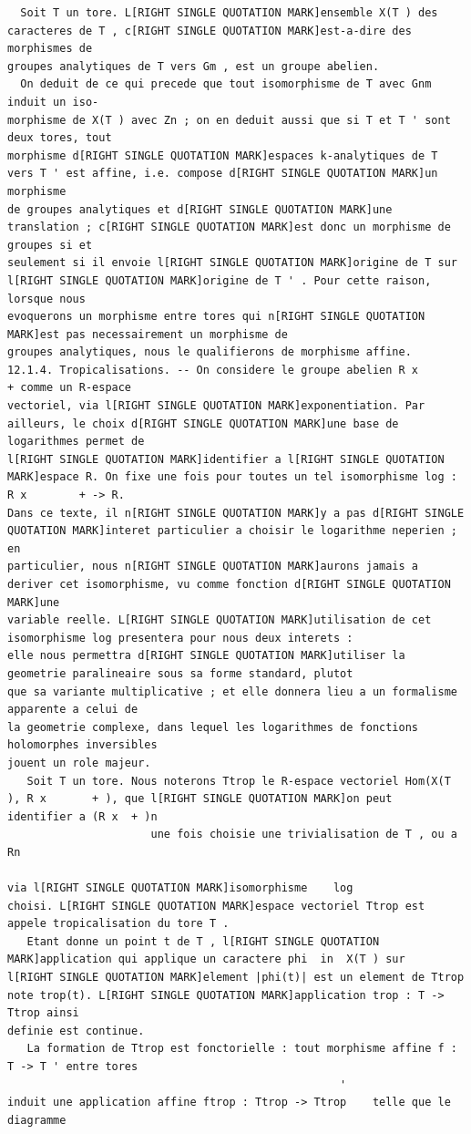 \documentclass[
  11pt,
]{article}
\begin{document}
\begin{lstlisting}
  Soit T un tore. L[RIGHT SINGLE QUOTATION MARK]ensemble X(T ) des caracteres de T , c[RIGHT SINGLE QUOTATION MARK]est-a-dire des morphismes de
groupes analytiques de T vers Gm , est un groupe abelien.
  On deduit de ce qui precede que tout isomorphisme de T avec Gnm induit un iso-
morphisme de X(T ) avec Zn ; on en deduit aussi que si T et T ' sont deux tores, tout
morphisme d[RIGHT SINGLE QUOTATION MARK]espaces k-analytiques de T vers T ' est affine, i.e. compose d[RIGHT SINGLE QUOTATION MARK]un morphisme
de groupes analytiques et d[RIGHT SINGLE QUOTATION MARK]une translation ; c[RIGHT SINGLE QUOTATION MARK]est donc un morphisme de groupes si et
seulement si il envoie l[RIGHT SINGLE QUOTATION MARK]origine de T sur l[RIGHT SINGLE QUOTATION MARK]origine de T ' . Pour cette raison, lorsque nous
evoquerons un morphisme entre tores qui n[RIGHT SINGLE QUOTATION MARK]est pas necessairement un morphisme de
groupes analytiques, nous le qualifierons de morphisme affine.
12.1.4. Tropicalisations. -- On considere le groupe abelien R x             + comme un R-espace
vectoriel, via l[RIGHT SINGLE QUOTATION MARK]exponentiation. Par ailleurs, le choix d[RIGHT SINGLE QUOTATION MARK]une base de logarithmes permet de
l[RIGHT SINGLE QUOTATION MARK]identifier a l[RIGHT SINGLE QUOTATION MARK]espace R. On fixe une fois pour toutes un tel isomorphisme log : R x        + -> R.
Dans ce texte, il n[RIGHT SINGLE QUOTATION MARK]y a pas d[RIGHT SINGLE QUOTATION MARK]interet particulier a choisir le logarithme neperien ; en
particulier, nous n[RIGHT SINGLE QUOTATION MARK]aurons jamais a deriver cet isomorphisme, vu comme fonction d[RIGHT SINGLE QUOTATION MARK]une
variable reelle. L[RIGHT SINGLE QUOTATION MARK]utilisation de cet isomorphisme log presentera pour nous deux interets :
elle nous permettra d[RIGHT SINGLE QUOTATION MARK]utiliser la geometrie paralineaire sous sa forme standard, plutot
que sa variante multiplicative ; et elle donnera lieu a un formalisme apparente a celui de
la geometrie complexe, dans lequel les logarithmes de fonctions holomorphes inversibles
jouent un role majeur.
   Soit T un tore. Nous noterons Ttrop le R-espace vectoriel Hom(X(T ), R x       + ), que l[RIGHT SINGLE QUOTATION MARK]on peut
identifier a (R x  + )n
                      une fois choisie une trivialisation de T , ou a Rn
                                                                         via l[RIGHT SINGLE QUOTATION MARK]isomorphisme    log
choisi. L[RIGHT SINGLE QUOTATION MARK]espace vectoriel Ttrop est appele tropicalisation du tore T .
   Etant donne un point t de T , l[RIGHT SINGLE QUOTATION MARK]application qui applique un caractere phi  in  X(T ) sur
l[RIGHT SINGLE QUOTATION MARK]element |phi(t)| est un element de Ttrop note trop(t). L[RIGHT SINGLE QUOTATION MARK]application trop : T -> Ttrop ainsi
definie est continue.
   La formation de Ttrop est fonctorielle : tout morphisme affine f : T -> T ' entre tores
                                                   '
induit une application affine ftrop : Ttrop -> Ttrop    telle que le diagramme


\end{lstlisting}
\end{document}
